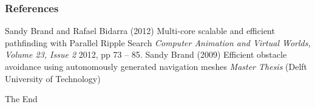\documentclass{beamer}
\begin{document}
\begin{frame}
\frametitle{References}
\footnotesize{
\begin{thebibliography}{99} %
 Sandy Brand and Rafael Bidarra (2012)
\newblock Multi-core scalable and efficient pathfinding with
Parallel Ripple Search
\newblock \emph{Computer Animation and Virtual Worlds, Volume 23, Issue 2} 2012, pp 73 -- 85.
 Sandy Brand (2009)
\newblock Efficient obstacle avoidance using autonomously generated navigation meshes
\newblock \emph{Master Thesis} (Delft University of Technology)
\end{thebibliography}
}
\end{frame}







\begin{frame}
\Huge{\centerline{The End}}
\end{frame}

\end{document}
